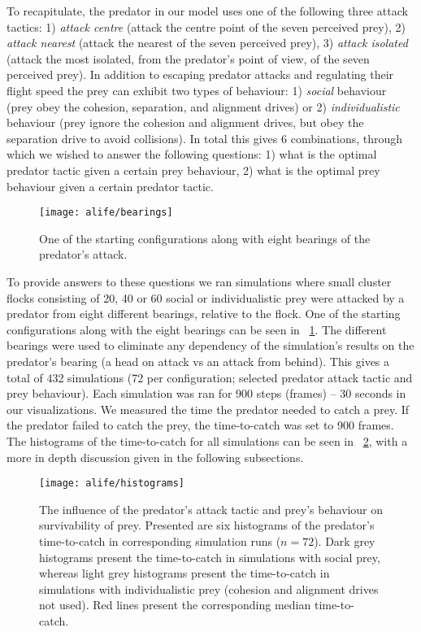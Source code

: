 To recapitulate, the predator in our model uses one of the following three attack tactics: 1) \emph{attack centre} (\ie attack the centre point of the seven perceived prey), 2) \emph{attack nearest} (\ie attack the nearest of the seven perceived prey), 3) \emph{attack isolated} (\ie attack the most isolated, from the predator's point of view, of the seven perceived prey). In addition to escaping predator attacks and regulating their flight speed the prey can exhibit two types of behaviour: 1) \emph{social} behaviour (\ie prey obey the cohesion, separation, and alignment drives) or 2) \emph{individualistic} behaviour (\ie prey ignore the cohesion and alignment drives, but obey the separation drive to avoid collisions). In total this gives 6 combinations, through which we wished to answer the following questions: 1) what is the optimal predator tactic given a certain prey behaviour, 2) what is the optimal prey behaviour given a certain predator tactic.

\begin{figure}
  \texttt{[image: alife/bearings]}
  \caption{One of the starting configurations along with eight bearings of the predator's attack.}
  \label{figBearings}
\end{figure}

To provide answers to these questions we ran simulations where small cluster flocks consisting of 20, 40 or 60 social or individualistic prey were attacked by a predator from eight different bearings, relative to the flock. One of the starting configurations along with the eight bearings can be seen in \figurename~\ref{figBearings}. The different bearings were used to eliminate any dependency of the simulation's results on the predator's bearing (\eg a head on attack vs an attack from behind). This gives a total of 432 simulations (72 per configuration; selected predator attack tactic and prey behaviour). Each simulation was ran for 900 steps (frames) -- 30 seconds in our visualizations. We measured the time the predator needed to catch a prey. If the predator failed to catch the prey, the time-to-catch was set to 900 frames. The histograms of the time-to-catch for all simulations can be seen in \figurename~\ref{figHistograms}, with a more in depth discussion given in the following subsections.

\begin{figure}
  \texttt{[image: alife/histograms]}
  \caption{The influence of the predator's attack tactic and prey's behaviour on survivability of prey. Presented are six histograms of the predator's time-to-catch in corresponding simulation runs ($n=72$). Dark grey histograms present the time-to-catch in simulations with social prey, whereas light grey histograms present the time-to-catch in simulations with individualistic prey (cohesion and alignment drives not used). Red lines present the corresponding median time-to-catch.}
  \label{figHistograms}
\end{figure}

